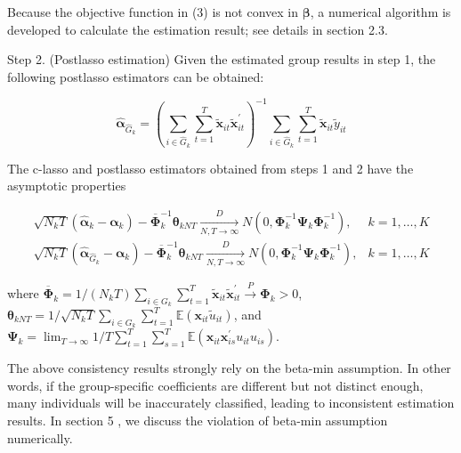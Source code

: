 \documentclass[10pt]{article}
\begin{document}
Because the objective function in (3) is not convex in $\boldsymbol{\beta}$, a numerical algorithm is developed to calculate the estimation result; see details in section 2.3.

Step 2. (Postlasso estimation) Given the estimated group results in step 1, the following postlasso estimators can be obtained:

$$
\widehat{\boldsymbol{\alpha}}_{\widehat{G}_{k}}=\left(\sum_{i \in \widehat{G}_{k}} \sum_{t=1}^{T} \widetilde{\mathbf{x}}_{i t} \widetilde{\mathbf{x}}_{i t}^{\prime}\right)^{-1} \sum_{i \in \widehat{G}_{k}} \sum_{t=1}^{T} \widetilde{\mathbf{x}}_{i t} \widetilde{y}_{i t}
$$

The c-lasso and postlasso estimators obtained from steps 1 and 2 have the asymptotic properties

$$
\begin{aligned}
\sqrt{N_{k} T}\left(\widehat{\boldsymbol{\alpha}}_{k}-\boldsymbol{\alpha}_{k}\right)-\overline{\boldsymbol{\Phi}}_{k}^{-1} \boldsymbol{\theta}_{k N T} \xrightarrow[N, T \rightarrow \infty]{D} N\left(0, \boldsymbol{\Phi}_{k}^{-1} \boldsymbol{\Psi}_{k} \boldsymbol{\Phi}_{k}^{-1}\right), & k=1, \ldots, K \\
\sqrt{N_{k} T}\left(\widehat{\boldsymbol{\alpha}}_{\widehat{G}_{k}}-\boldsymbol{\alpha}_{k}\right)-\overline{\boldsymbol{\Phi}}_{k}^{-1} \boldsymbol{\theta}_{k N T} \xrightarrow[N, T \rightarrow \infty]{D} N\left(0, \boldsymbol{\Phi}_{k}^{-1} \boldsymbol{\Psi}_{k} \boldsymbol{\Phi}_{k}^{-1}\right), & k=1, \ldots, K
\end{aligned}
$$

where $\overline{\boldsymbol{\Phi}}_{k}=1 /\left(N_{k} T\right) \sum_{i \in G_{k}} \sum_{t=1}^{T} \widetilde{\mathbf{x}}_{i t} \widetilde{\mathbf{x}}_{i t}^{\prime} \xrightarrow{P} \boldsymbol{\Phi}_{k}>0$, $\boldsymbol{\theta}_{k N T}=1 / \sqrt{N_{k} T} \sum_{i \in G_{k}} \sum_{t=1}^{T} \mathbb{E}\left(\mathbf{x}_{i t} \widetilde{u}_{i t}\right)$, and $\boldsymbol{\Psi}_{k}=\lim _{T \rightarrow \infty} 1 / T \sum_{t=1}^{T} \sum_{s=1}^{T} \mathbb{E}\left(\mathbf{x}_{i t} \mathbf{x}_{i s}^{\prime} u_{i t} u_{i s}\right)$.

The above consistency results strongly rely on the beta-min assumption. In other words, if the group-specific coefficients are different but not distinct enough, many individuals will be inaccurately classified, leading to inconsistent estimation results. In section 5 , we discuss the violation of beta-min assumption numerically.
\end{document}
